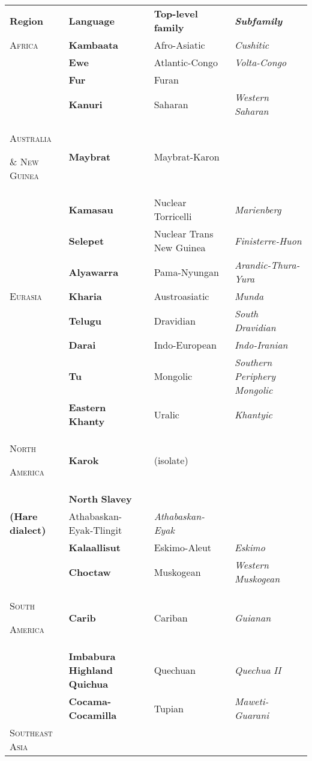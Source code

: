 \begin{table}
\begin{tabularx}{\textwidth}{XXXX}
\lsptoprule

\textbf{Region} & \textbf{Language} & \textbf{Top-level} \textbf{family} & \textbf{\textit{Subfamily}}\\
\textsc{Africa} & \textbf{Kambaata} & Afro-Asiatic & \textit{Cushitic}\\
\hhline{-~~~} & \textbf{Ewe} & Atlantic-Congo & \textit{Volta-Congo}\\
& \textbf{Fur} & Furan & \\
& \textbf{Kanuri} & Saharan & \textit{Western} \textit{Saharan}\\
\textsc{Australia} 

\textsc{\&} \textsc{New} \textsc{Guinea} & \textbf{Maybrat} & Maybrat-Karon & \\
\hhline{-~~~} & \textbf{Kamasau} & Nuclear Torricelli & \textit{Marienberg}\\
& \textbf{Selepet} & Nuclear Trans New Guinea & \textit{Finisterre-Huon}\\
& \textbf{Alyawarra} & Pama-Nyungan & \textit{Arandic-Thura-Yura}\\
\textsc{Eurasia} & \textbf{Kharia} & Austroasiatic & \textit{Munda}\\
\hhline{-~~~} & \textbf{Telugu} & Dravidian & \textit{South} \textit{Dravidian}\\
& \textbf{Darai} & Indo-European & \textit{Indo-Iranian}\\
& \textbf{Tu} & Mongolic & \textit{Southern} \textit{Periphery} \textit{Mongolic}\\
& \textbf{Eastern} \textbf{Khanty} & Uralic & \textit{Khantyic}\\
\textsc{North} 

\textsc{America} & \textbf{Karok} & (isolate) & \\
\hhline{-~~~} & \textbf{North} \textbf{Slavey} \\
\textbf{(Hare} \textbf{dialect)} & Athabaskan-Eyak-Tlingit & \textit{Athabaskan-Eyak}\\
& \textbf{Kalaallisut} & Eskimo-Aleut & \textit{Eskimo}\\
& \textbf{Choctaw} & Muskogean & \textit{Western} \textit{Muskogean}\\
\textsc{South} 

\textsc{America} & \textbf{Carib} & Cariban & \textit{Guianan}\\
\hhline{-~~~} & \textbf{Imbabura} \textbf{Highland} \textbf{Quichua} & Quechuan & \textit{Quechua} \textit{II}\\
& \textbf{Cocama-Cocamilla} & Tupian & \textit{Maweti-Guarani}\\
\textsc{Southeast} \textsc{Asia} 


\end{tabularx}
\end{table}
